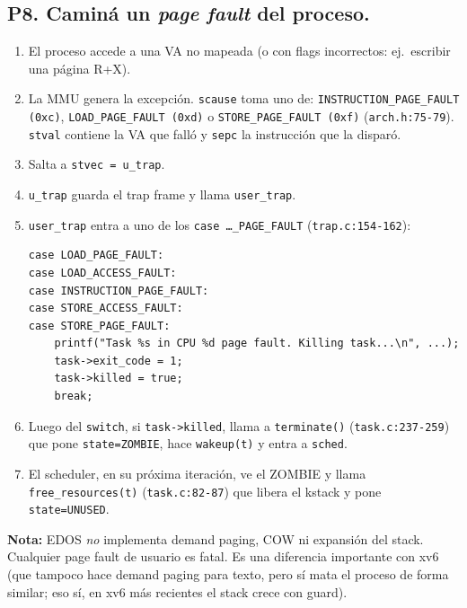 \documentclass[11pt,a4paper]{article}
\begin{document}
\subsection*{P8. Caminá un \emph{page fault} del proceso.}

\begin{respuesta}
\begin{enumerate}[leftmargin=*]
    \item El proceso accede a una VA no mapeada (o con flags
        incorrectos: ej.\ escribir una página R+X).
    \item La MMU genera la excepción. \texttt{scause} toma uno de:
        \texttt{INSTRUCTION\_PAGE\_FAULT (0xc)},
        \texttt{LOAD\_PAGE\_FAULT (0xd)} o
        \texttt{STORE\_PAGE\_FAULT (0xf)} (\texttt{arch.h:75-79}).
        \texttt{stval} contiene la VA que falló y \texttt{sepc} la
        instrucción que la disparó.
    \item Salta a \texttt{stvec = u\_trap}.
    \item \texttt{u\_trap} guarda el trap frame y llama
        \texttt{user\_trap}.
    \item \texttt{user\_trap} entra a uno de los \texttt{case
        \dots\_PAGE\_FAULT} (\texttt{trap.c:154-162}):
\begin{lstlisting}[style=cstyle]
case LOAD_PAGE_FAULT:
case LOAD_ACCESS_FAULT:
case INSTRUCTION_PAGE_FAULT:
case STORE_ACCESS_FAULT:
case STORE_PAGE_FAULT:
    printf("Task %s in CPU %d page fault. Killing task...\n", ...);
    task->exit_code = 1;
    task->killed = true;
    break;
\end{lstlisting}
    \item Luego del \texttt{switch}, si \texttt{task->killed},
        llama a \texttt{terminate()} (\texttt{task.c:237-259}) que
        pone \texttt{state=ZOMBIE}, hace \texttt{wakeup(t)} y entra
        a \texttt{sched}.
    \item El scheduler, en su próxima iteración, ve el ZOMBIE y
        llama \texttt{free\_resources(t)} (\texttt{task.c:82-87})
        que libera el kstack y pone \texttt{state=UNUSED}.
\end{enumerate}

\textbf{Nota:} EDOS \emph{no} implementa demand paging, COW ni
expansión del stack. Cualquier page fault de usuario es fatal. Es
una diferencia importante con xv6 (que tampoco hace demand paging
para texto, pero sí mata el proceso de forma similar; eso sí, en
xv6 más recientes el stack crece con guard).
\end{respuesta}
\end{document}
